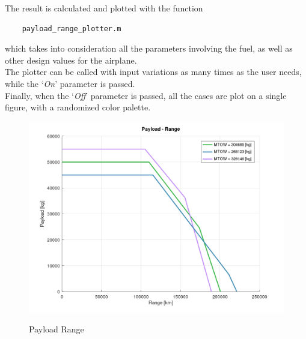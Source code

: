 \documentclass{article}
\begin{document}
The result is calculated and plotted with the function \autocite{Airbus_replacement_repo}
\begin{verbatim}
    payload_range_plotter.m
\end{verbatim}
which takes into consideration all the parameters involving the fuel, as well as other design values for the airplane.\\ 
The plotter can be called with input variations as many times as the user needs, while the `\textit{On}' parameter
is passed. \\ 
Finally, when the `\textit{Off}' parameter is passed, all the cases are plot on a single figure, with 
a randomized color palette.
\begin{figure}[h!]
    \centering
    \includegraphics[width=\textwidth]{Sources/Plots_and_Pictures/Payload_range.png}
    \label{Payload_Range}
    \caption{Payload Range}
\end{figure}
\clearpage
\end{document}
